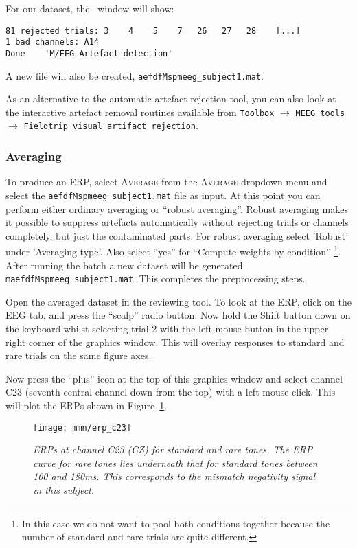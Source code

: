 For our dataset, the \matlab\ window will show:
\begin{verbatim}
81 rejected trials: 3    4    5    7   26   27   28    [...]
1 bad channels: A14
Done    'M/EEG Artefact detection'
\end{verbatim}
A new file will also be created, \texttt{aefdfMspmeeg\_subject1.mat}.

As an alternative to the automatic artefact rejection tool, you can also look at the interactive artefact removal routines available from \texttt{Toolbox} $\rightarrow$ \texttt{MEEG tools} $\rightarrow$  \texttt{Fieldtrip visual artifact rejection}.

\subsubsection{Averaging}
To produce an ERP, select  \textsc{Average} from the  \textsc{Average} dropdown menu and select the \texttt{aefdfMspmeeg\_subject1.mat} file as input. At this point you can perform either ordinary averaging or ``robust averaging''. Robust averaging makes it possible to suppress artefacts automatically without rejecting trials or channels completely, but just the contaminated parts. For robust averaging select 'Robust' under 'Averaging type'.  Also select ``yes'' for ``Compute weights by condition'' \footnote{In this case we do not want to pool both conditions together because the number of standard and rare trials are quite different.}. After running the batch a new dataset will be generated \texttt{maefdfMspmeeg\_subject1.mat}. This completes the preprocessing steps.

Open the averaged dataset in the reviewing tool. To look at the ERP, click on the EEG tab, and press the ``scalp'' radio button. Now hold  the Shift button down on the keyboard whilst selecting trial 2 with the left mouse button in the upper right corner of the graphics window. This will overlay responses to standard and rare trials on the same figure axes.

Now press the ``plus'' icon at the top of this graphics window and select channel C23 (seventh central channel down from the top) with a left mouse click. This will plot the ERPs shown in Figure~\ref{c23}. 
\begin{figure}
\begin{center}
\texttt{[image: mmn/erp\_c23]}
\caption{\em ERPs at channel C23 (CZ) for standard and rare tones. The ERP curve for rare tones lies underneath that for standard tones between 100 and 180ms. This corresponds to the mismatch negativity signal in this subject. \label{c23}}
\end{center}
\end{figure}

